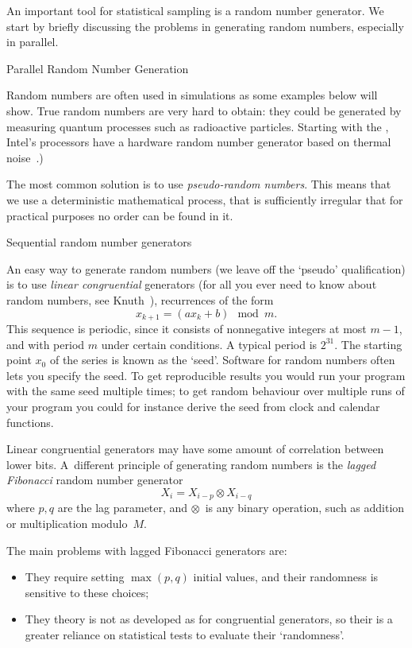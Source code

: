 An important tool for statistical sampling is a random number generator.
We start by briefly discussing the problems in generating random
numbers, especially in parallel.

 {Parallel Random Number Generation}
\label{sec:parallel-random}

Random numbers are often used in simulations as some examples below
will show. True random numbers are very hard to obtain: they could be
generated by measuring quantum processes such as radioactive
particles. Starting with the ,
Intel's processors have a hardware random number generator based on
thermal noise~\cite{Cryptography:IvyRandom2012}.)

The most common solution is to use
\emph{pseudo-random numbers}. This means that we use a deterministic mathematical
process, that is sufficiently irregular that for practical purposes no
order can be found in it.

 {Sequential random number generators}

An easy way to generate random numbers (we leave off the `pseudo'
qualification) is to use
\emph{linear congruential}
 generators (for all you
ever need to know about random numbers, see Knuth~\cite{Knuth:vol2}),
recurrences of the form
\[ x_{k+1} = (ax_k+b) \mod m. \]
This sequence is periodic, since it consists of nonnegative integers at most
$m-1$, and with period $m$ under certain conditions. A
typical period is $2^{31}$. The starting point $x_0$ of the series is
known as the `seed'. Software for random numbers often lets you
specify the seed. To get reproducible results you would run your
program with the same seed multiple times; to get random behaviour
over multiple runs of your program you could for instance derive the
seed from clock and calendar functions.

Linear congruential generators may have some amount of correlation
between lower bits. A~different principle of generating random numbers
is the
\emph{lagged Fibonacci}
random number generator
\[ X_i = X_{i-p}\otimes X_{i-q} \]
where $p,q$ are the lag parameter, and $\otimes$~is any binary operation,
such as addition or multiplication modulo~$M$.

The main problems with lagged Fibonacci generators are:
\begin{itemize}
\item They require setting $\max(p,q)$ initial values, and their
  randomness is sensitive to these choices;
\item They theory is not as developed as for congruential generators,
  so their is a greater reliance on statistical tests to evaluate
  their `randomness'.
\end{itemize}

